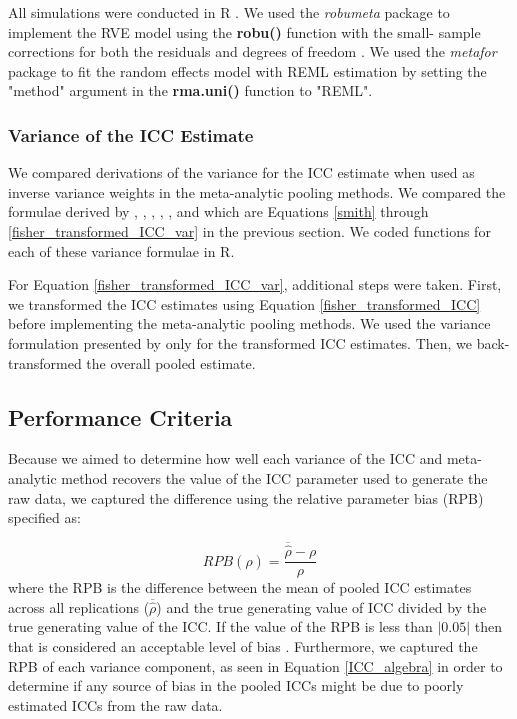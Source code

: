 All simulations were conducted in R \cite{rcoreteam2020a}. We used the \emph{robumeta} package \cite{fisher2017a} to implement the RVE model using the \textbf{robu()} function with the small- sample corrections for both the residuals and degrees of freedom \cite{tipton2015a}. We used the \emph{metafor} package \cite{viechtbauer2010} to fit the random effects model with REML estimation by setting the "method" argument in the \textbf{rma.uni()} function to "REML".

\subsubsection{Variance of the ICC Estimate}
We compared derivations of the variance for the ICC estimate when used as inverse variance weights in the meta-analytic pooling methods. We compared the formulae derived by , , , ,  , and  which are Equations \ref{smith} through \ref{fisher_transformed_ICC_var} in the previous section.  We coded functions for each of these variance formulae in R.

For Equation \ref{fisher_transformed_ICC_var}, additional steps were taken. First, we transformed the ICC estimates using Equation \ref{fisher_transformed_ICC} before implementing the meta-analytic pooling methods. We used the variance formulation presented by  only for the transformed ICC estimates. Then, we back-transformed the overall pooled estimate. 

\subsection{Performance Criteria}

Because we aimed to determine how well each variance of the ICC and meta-analytic method recovers the value of the ICC parameter used to generate the raw data,  we captured the difference using the relative parameter bias (RPB) specified as:

\begin{equation}
  RPB(\hat{\rho}) = \frac{\overline{\hat{\rho}} - \rho}{\rho}
\end{equation}
where the RPB is the difference between the mean of pooled ICC estimates across all replications ($\overline{\hat{\rho}}$) and the true generating value of ICC divided by the true generating value of the ICC. If the value of the RPB is less than $\lvert0.05\rvert$ then that is considered an acceptable level of bias \cite{hoogland1998}. Furthermore, we captured the RPB of each variance component, as seen in Equation \ref{ICC_algebra} in order to determine if any source of bias in the pooled ICCs might be due to poorly estimated ICCs from the raw data.   

